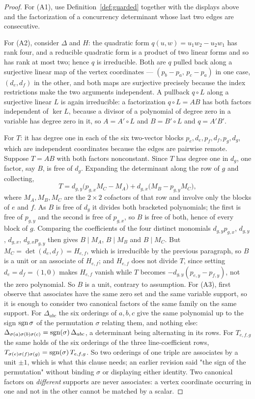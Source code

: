 \begin{proof}
For (A1), use Definition~\ref{def:guarded} together with the displays above and the
factorization of a concurrency determinant whose last two edges are
consecutive.

For (A2), consider $\Delta$ and $H$: the quadratic form $q(u,w)=u_1w_2-u_2w_1$ has rank
four, and a reducible quadratic form is a product of two linear forms and so has
rank at most two; hence $q$ is irreducible. Both are $q$ pulled back along a
surjective linear map of the vertex coordinates --- $(p_b-p_a,\,p_c-p_a)$ in one
case, $(d_e,d_f)$ in the other, and both maps are surjective precisely because
the index restrictions make the two arguments independent. A pullback $q\circ L$
along a surjective linear $L$ is again irreducible: a factorization $q\circ L=AB$
has both factors independent of $\ker L$, because a divisor of a polynomial of
degree zero in a variable has degree zero in it, so $A=A'\circ L$ and
$B=B'\circ L$ and $q=A'B'$.

For $T$: it has degree one in each of the six two-vector blocks
$p_e,d_e,p_f,d_f,p_g,d_g$, which are independent coordinates because the edges
are pairwise remote. Suppose $T=AB$ with both factors nonconstant. Since $T$ has
degree one in $d_g$, one factor, say $B$, is free of $d_g$. Expanding the
determinant along the row of $g$ and collecting,
\[
   T=d_{g,y}\bigl(p_{g,x}M_C-M_A\bigr)+d_{g,x}\bigl(M_B-p_{g,y}M_C\bigr),
\]
where $M_A,M_B,M_C$ are the $2\times2$ cofactors of that row and involve only
the blocks of $e$ and $f$. As $B$ is free of $d_g$ it divides both bracketed
polynomials; the first is free of $p_{g,y}$ and the second is free of
$p_{g,x}$, so $B$ is free of both, hence of every block of $g$. Comparing the
coefficients of the four distinct monomials $d_{g,y}p_{g,x}$, $d_{g,y}$,
$d_{g,x}$, $d_{g,x}p_{g,y}$ then gives $B\mid M_A$, $B\mid M_B$ and
$B\mid M_C$. But $M_C=\det(d_e,d_f)=H_{e,f}$, which is irreducible by the
previous paragraph, so $B$ is a unit or an associate of $H_{e,f}$; and
$H_{e,f}$ does not divide $T$, since setting $d_e=d_f=(1,0)$ makes $H_{e,f}$
vanish while $T$ becomes $-d_{g,y}(p_{e,y}-p_{f,y})$, not the zero polynomial.
So $B$ is a unit, contrary to assumption.
For (A3), first observe that associates have the same zero set and the same variable support, so it is
enough to consider two canonical factors of the same family on the same
support. For $\Delta_{abc}$ the six orderings of $a,b,c$ give the same polynomial up to
the sign $\operatorname{sgn}\sigma$ of the permutation $\sigma$ relating them, and nothing
else: $\Delta_{\sigma(a)\sigma(b)\sigma(c)}=\operatorname{sgn}(\sigma)\,\Delta_{abc}$,
a determinant being alternating in its rows. For $T_{e,f,g}$ the same holds of
the six orderings of the three line-coefficient rows,
$T_{\sigma(e)\sigma(f)\sigma(g)}=\operatorname{sgn}(\sigma)\,T_{e,f,g}$. So two orderings of
one triple are associates by a unit $\pm1$, which is what this clause needs; an
earlier revision said "the sign of the permutation" without binding $\sigma$ or
displaying either identity. Two canonical
factors on \emph{different} supports are never associates: a vertex coordinate
occurring in one and not in the other cannot be matched by a scalar.


\end{proof}
